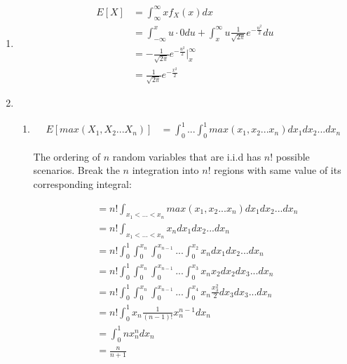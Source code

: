 \documentclass[11pt,letterpaper,titlepage]{article}
\begin{document}
\begin{enumerate}
    \item %
    
    \begin{equation*}
        \begin{aligned}
            E[X] &= \int_{\infty}^{\infty} x f_X(x) dx \\
            &= \int_{-\infty}^{x} u \cdot 0 du + \int_{x}^{\infty} u \frac{1}{\sqrt{2\pi}} e^{-\frac{u^2}{2}} du \\
            &= -\frac{1}{\sqrt{2\pi}} e^{-\frac{u^2}{2}} |_{x}^{\infty} \\
            &= \frac{1}{\sqrt{2\pi}} e^{-\frac{x^2}{2}}
        \end{aligned}
    \end{equation*}
    
    \item %
    
    \begin{enumerate}
    
        \item 
        
        \begin{equation*}
            \begin{aligned}
                E[max(X_1, X_2...X_n)] &= \int_{0}^{1}...\int_{0}^{1} max(x_1, x_2...x_n) dx_1 dx_2...dx_n
            \end{aligned}
        \end{equation*}
        
        The ordering of $n$ random variables that are i.i.d has $n!$ possible scenarios. Break the $n$ integration into $n!$ regions with same value of its corresponding integral:
        
        \begin{equation*}
            \begin{aligned}
                &= n! \int_{x_1<...<x_n} max(x_1, x_2...x_n) dx_1 dx_2...dx_n \\
                &= n! \int_{x_1<...<x_n} x_n dx_1 dx_2...dx_n \\
                &= n! \int_{0}^{1} \int_{0}^{x_n} \int_{0}^{x_{n-1}}...\int_{0}^{x_{2}} x_n dx_1 dx_2...dx_n \\
                &= n! \int_{0}^{1} \int_{0}^{x_n} \int_{0}^{x_{n-1}}...\int_{0}^{x_{3}} x_n x_2 dx_2 dx_3...dx_n \\
                &= n! \int_{0}^{1} \int_{0}^{x_n} \int_{0}^{x_{n-1}}...\int_{0}^{x_{4}} x_n \frac{x_3^2}{2} dx_3 dx_3...dx_n \\
                &= n! \int_{0}^{1} x_n \frac{1}{(n-1)!} x_n^{n-1} dx_n \\
                &= \int_{0}^{1} n x_n^n dx_n \\
                &= \frac{n}{n+1}
            \end{aligned}
        \end{equation*}
        

\end{enumerate}
\end{enumerate}
\end{document}
